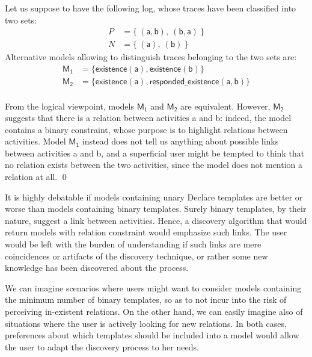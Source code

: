 \begin{example}
\label{ex:unaryVsBinary}
Let us suppose to have the following log, whose traces have been classified into two sets:
%
\begin{align*}
P & = \{\ (\mathsf{a}, \mathsf{b}),\ (\mathsf{b}, \mathsf{a})\ \} \\
N & = \{\ (\mathsf{a}),\ (\mathsf{b})\ \}
\end{align*}
%
Alternative models allowing to distinguish traces belonging to the two sets are:
\begin{align*}
\mathsf{M_1} & = \{ \mathsf{existence(a),existence(b)}\} \\
\mathsf{M_2} & = \{ \mathsf{existence(a), responded\_existence(a, b)}\}
\end{align*}
%
\\

From the logical viewpoint, models $\mathsf{M_1}$ and $\mathsf{M_2}$ are equivalent. However, $\mathsf{M_2}$ suggests that there is a relation between activities \textsf{a} and \textsf{b}: indeed, the model contains a binary constraint, whose purpose is to highlight relations between activities. Model $\mathsf{M_1}$  instead does not tell us anything about possible links between activities \textsf{a} and \textsf{b}, and a superficial user might be tempted to think that no relation exists between the two activities, since the model does not mention a relation at all.
\qed
\end{example}

It is highly debatable if models containing unary Declare templates are better or worse than models containing binary templates. Surely binary templates, by their nature, suggest a link between activities. Hence, a discovery algorithm that would return models with relation constraint would emphasize such links. The user would be left with the burden of understanding if such links are mere coincidences or artifacts of the discovery technique, or rather some new knowledge has been discovered about the process.

We can imagine scenarios where users might want to consider models containing the minimum number of binary templates, so as to not incur into the risk of perceiving in-existent relations. On the other hand, we can easily imagine also of situations where the user is actively looking for new relations. In both cases, preferences about which templates should be included into a model would allow the user to adapt the discovery process to her needs.

